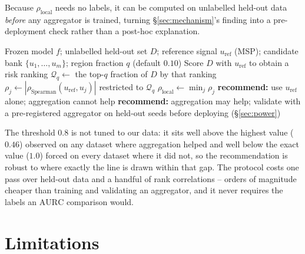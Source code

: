 \documentclass[conference]{IEEEtran}
\newcommand{\aurc}{\mathrm{AURC}}
\newcommand{\rholocal}{\rho_{\mathrm{local}}}
\begin{document}
Because $\rholocal$ needs no labels, it can be computed on unlabelled held-out data \emph{before} any aggregator is trained, turning \S\ref{sec:mechanism}'s finding into a pre-deployment check rather than a post-hoc explanation.

\begin{algorithm}[t]
\caption{Boundary-Local Redundancy Screen}
\label{alg:screen}
\begin{algorithmic}[1]
\REQUIRE Frozen model $f$; unlabelled held-out set $D$; reference signal $u_{\mathrm{ref}}$ (MSP); candidate bank $\{u_1,\dots,u_m\}$; region fraction $q$ (default $0.10$)
\STATE Score $D$ with $u_{\mathrm{ref}}$ to obtain a risk ranking
\STATE $\mathcal{Q}_q \gets$ the top-$q$ fraction of $D$ by that ranking
  \STATE $\rho_j \gets |\rho_{\mathrm{Spearman}}(u_{\mathrm{ref}}, u_j)|$ restricted to $\mathcal{Q}_q$
\ENDFOR
\STATE $\rholocal \gets \min_j \rho_j$
\IF{$\rholocal \gtrsim 0.8$}
  \STATE \textbf{recommend:} use $u_{\mathrm{ref}}$ alone; aggregation cannot help
\ELSE
  \STATE \textbf{recommend:} aggregation may help; validate with a pre-registered aggregator on held-out seeds before deploying (\S\ref{sec:power})
\ENDIF
\end{algorithmic}
\end{algorithm}

The threshold $0.8$ is not tuned to our data: it sits well above the highest value ($0.46$) observed on any dataset where aggregation helped and well below the exact value ($1.0$) forced on every dataset where it did not, so the recommendation is robust to where exactly the line is drawn within that gap. The protocol costs one pass over held-out data and a handful of rank correlations -- orders of magnitude cheaper than training and validating an aggregator, and it never requires the labels an $\aurc$ comparison would.

\section{Limitations}
\label{sec:limitations}
\end{document}
